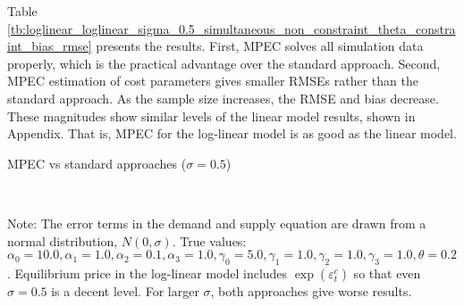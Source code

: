 \documentclass[11pt, a4paper]{article}
\begin{document}
Table \ref{tb:loglinear_loglinear_sigma_0.5_simultaneous_non_constraint_theta_constraint_bias_rmse} presents the results.
First, MPEC solves all simulation data properly, which is the practical advantage over the standard approach.
Second, MPEC estimation of cost parameters gives smaller RMSEs rather than the standard approach.
As the sample size increases, the RMSE and bias decrease. These magnitudes show similar levels of the linear model results, shown in Appendix. 
That is, MPEC for the log-linear model is as good as the linear model.

\begin{table}[!htbp]
  \begin{center}
      \caption{MPEC vs standard approaches ($\sigma=0.5$)
      }
      \label{tb:loglinear_loglinear_sigma_0.5_simultaneous_non_constraint_theta_constraint_bias_rmse} 
      \subfloat[MPEC]{}\\
    \subfloat[Simultaneous]{}
  \end{center}
  \footnotesize
  Note: The error terms in the demand and supply equation are drawn from a normal distribution, $N(0, \sigma)$. True values: $\alpha_0=10.0,\alpha_1=1.0,\alpha_2=0.1,\alpha_3=1.0,\gamma_0=5.0,\gamma_1=1.0,\gamma_2=1.0,\gamma_3=1.0,\theta=0.2$. Equilibrium price in the log-linear model includes $\exp(\varepsilon_{t}^{c})$ so that even $\sigma=0.5$ is a decent level. For larger $\sigma$, both approaches give worse results.
\end{table} 
\end{document}

